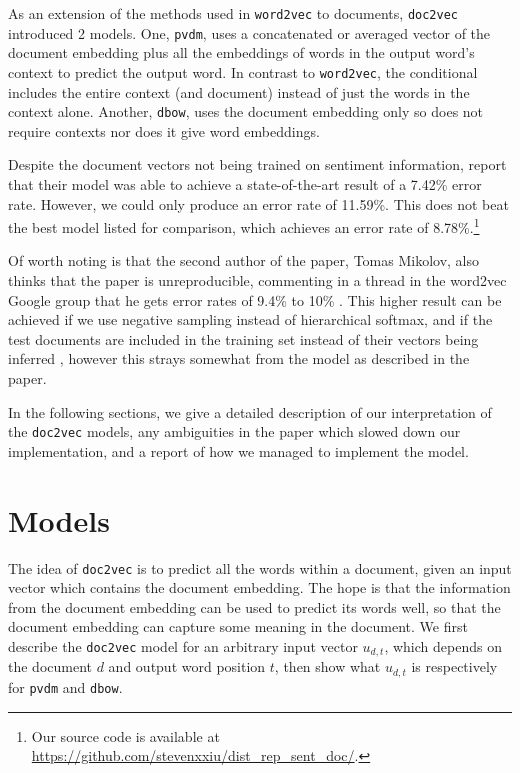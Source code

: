 \documentclass{article}
\begin{document}
As an extension of the methods used in \texttt{word2vec} to documents, \texttt{doc2vec} \citep{le_distributed_2014} introduced 2 models. One, \texttt{pvdm}, uses a concatenated or averaged vector of the document embedding plus all the embeddings of words in the output word's context to predict the output word. In contrast to \texttt{word2vec}, the conditional includes the entire context (and document) instead of just the words in the context alone. Another, \texttt{dbow}, uses the document embedding only so does not require contexts nor does it give word embeddings.

Despite the document vectors not being trained on sentiment information, \cite{le_distributed_2014} report that their model was able to achieve a state-of-the-art result of a 7.42\% error rate. However, we could only produce an error rate of 11.59\%. This does not beat the best model listed for comparison, which achieves an error rate of 8.78\%.\footnote{Our source code is available at \url{https://github.com/stevenxxiu/dist_rep_sent_doc/}.}

Of worth noting is that the second author of the paper, Tomas Mikolov, also thinks that the paper is unreproducible, commenting in a thread in the word2vec Google group that he gets error rates of 9.4\% to 10\% \citep{mikolov_distributed_2014} . This higher result can be achieved if we use negative sampling instead of hierarchical softmax, and if the test documents are included in the training set instead of their vectors being inferred \citep{mohr_gensim_2017}, however this strays somewhat from the model as described in the paper.

In the following sections, we give a detailed description of our interpretation of the \texttt{doc2vec} models, any ambiguities in the paper which slowed down our implementation, and a report of how we managed to implement the model.

\section{Models}
The idea of \texttt{doc2vec} is to predict all the words within a document, given an input vector which contains the document embedding. The hope is that the information from the document embedding can be used to predict its words well, so that the document embedding can capture some meaning in the document. We first describe the \texttt{doc2vec} model for an arbitrary input vector $u_{d,t}$, which depends on the document $d$ and output word position $t$, then show what $u_{d,t}$ is respectively for \texttt{pvdm} and \texttt{dbow}.
\end{document}
